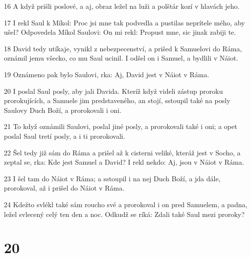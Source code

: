 \par 16 A když prišli poslové, a aj, obraz ležel na luži a polštár kozí v hlavách jeho.
\par 17 I rekl Saul k Míkol: Proc jsi mne tak podvedla a pustilas neprítele mého, aby ušel? Odpovedela Míkol Saulovi: On mi rekl: Propust mne, sic jinak zabiji te.
\par 18 David tedy utíkaje, vynikl z nebezpecenství, a prišed k Samuelovi do Ráma, oznámil jemu všecko, co mu Saul ucinil. I odšel on i Samuel, a bydlili v Náiot.
\par 19 Oznámeno pak bylo Saulovi, rka: Aj, David jest v Náiot v Ráma.
\par 20 I poslal Saul posly, aby jali Davida. Kteríž když videli zástup proroku prorokujících, a Samuele jim predstaveného, an stojí, sstoupil také na posly Saulovy Duch Boží, a prorokovali i oni.
\par 21 To když oznámili Saulovi, poslal jiné posly, a prorokovali také i oni; a opet poslal Saul tretí posly, a i ti prorokovali.
\par 22 Šel tedy již sám do Ráma a prišel až k cisterni veliké, kteráž jest v Socho, a zeptal se, rka: Kde jest Samuel a David? I rekl nekdo: Aj, jsou v Náiot v Ráma.
\par 23 I šel tam do Náiot v Ráma; a sstoupil i na nej Duch Boží, a jda dále, prorokoval, až i prišel do Náiot v Ráma.
\par 24 Kdežto svlékl také sám roucho své a prorokoval i on pred Samuelem, a padna, ležel svlecený celý ten den a noc. Odkudž se ríká: Zdali také Saul mezi proroky?

\chapter{20}

